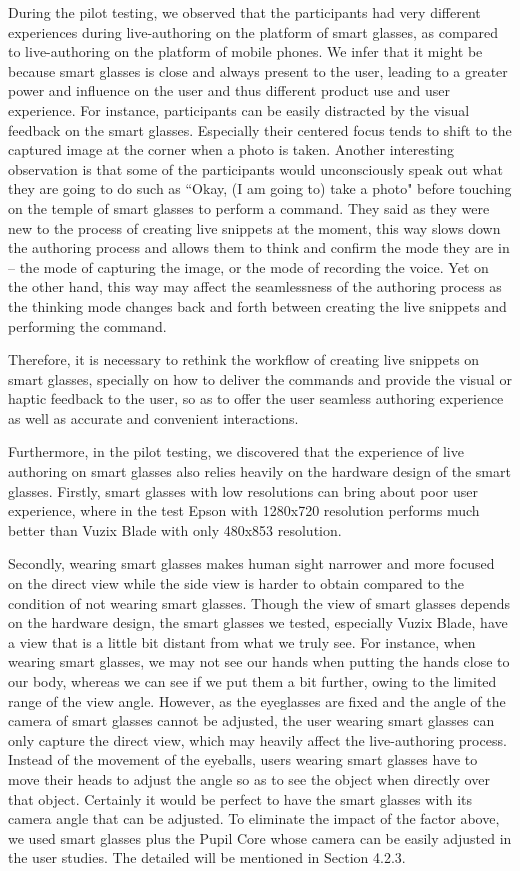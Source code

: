 \documentclass[fyp]{socreport}
\begin{document}
During the pilot testing, we observed that the participants had very different experiences during live-authoring on the platform of smart glasses, as compared to live-authoring on the platform of mobile phones. We infer that it might be because smart glasses is close and always present to the user, leading to a greater power and influence on the user \cite{zheng2015eye} and thus different product use and user experience. For instance, participants can be easily distracted by the visual feedback on the smart glasses. Especially their centered focus tends to shift to the captured image at the corner when a photo is taken. Another interesting observation is that some of the participants would unconsciously speak out what they are going to do such as ``Okay, (I am going to) take a photo" before touching on the temple of smart glasses to perform a command. They said as they were new to the process of creating live snippets at the moment, this way slows down the authoring process and allows them to think and confirm the mode they are in -- the mode of capturing the image, or the mode of recording the voice. Yet on the other hand, this way may affect the seamlessness of the authoring process as the thinking mode changes back and forth between creating the live snippets and performing the command. 

Therefore, it is necessary to rethink the workflow of creating live snippets on smart glasses, specially on how to deliver the commands and provide the visual or haptic feedback to the user, so as to offer the user seamless authoring experience as well as accurate and convenient interactions.

Furthermore, in the pilot testing, we discovered that the experience of live authoring on smart glasses also relies heavily on the hardware design of the smart glasses. Firstly, smart glasses with low resolutions can bring about poor user experience, where in the test Epson with 1280x720 resolution performs much better than Vuzix Blade with only 480x853 resolution. 

Secondly, wearing smart glasses makes human sight narrower and more focused on the direct view while the side view is harder to obtain compared to the condition of not wearing smart glasses. Though the view of smart glasses depends on the hardware design, the smart glasses we tested, especially Vuzix Blade, have a view that is a little bit distant from what we truly see. For instance, when wearing smart glasses, we may not see our hands when putting the hands close to our body, whereas we can see if we put them a bit further, owing to the limited range of the view angle. However, as the eyeglasses are fixed and the angle of the camera of smart glasses cannot be adjusted, the user wearing smart glasses can only capture the direct view, which may heavily affect the live-authoring process. Instead of the movement of the eyeballs, users wearing smart glasses have to move their heads to adjust the angle so as to see the object when directly over that object. Certainly it would be perfect to have the smart glasses with its camera angle that can be adjusted. To eliminate the impact of the factor above, we used smart glasses plus the Pupil Core whose camera can be easily adjusted in the user studies. The detailed will be mentioned in Section 4.2.3.
\end{document}
